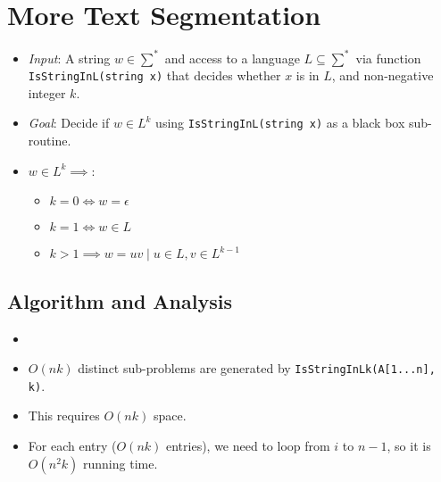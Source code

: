 \documentclass[12pt]{article}
\date{March 16, 2021}
\begin{document}
\maketitle

\section{More Text Segmentation}
\begin{itemize}
    \item \textit{Input}: A string $w \in \sum^{\ast}$ and access to a language $L \subseteq \sum^{\ast}$ via function \texttt{IsStringInL(string x)} that decides whether $x$ is in $L$, and non-negative integer $k$.
    \item \textit{Goal}: Decide if $w \in L^k$ using \texttt{IsStringInL(string x)} as a black box sub-routine.
    \item $w \in L^k \implies$:
    \begin{itemize}
        \item $k = 0 \iff w = \epsilon$
        \item $k = 1 \iff w \in L$
        \item $k > 1 \implies w = uv \mid  u \in L, v \in L^{k - 1}$
    \end{itemize}
\end{itemize}

\subsection{Algorithm and Analysis}
\begin{itemize}
    \item[] 
    \item $O(nk)$ distinct sub-problems are generated by \texttt{IsStringInLk(A[1...n], k)}.
    \item This requires $O(nk)$ space.
    \item For each entry ($O(nk)$ entries), we need to loop from $i$ to $n - 1$, so it is $O(n^2k)$ running time.
\end{itemize}
\end{document}
